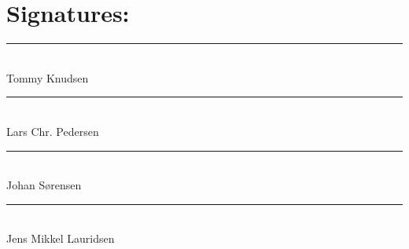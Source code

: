\chapter*{Signatures:}

\noindent\rule{8cm}{0.03cm}\\
Tommy Knudsen\\

\noindent\rule{8cm}{0.03cm}\\ 
Lars Chr. Pedersen\\ 

\noindent\rule{8cm}{0.03cm}\\
Johan Sørensen\\

\noindent\rule{8cm}{0.03cm}\\
Jens Mikkel Lauridsen\\
